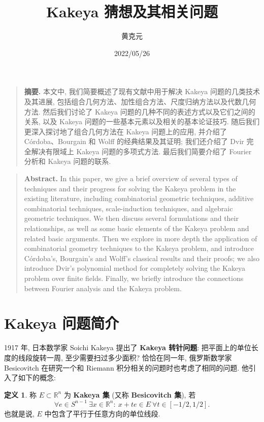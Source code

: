 \documentclass[a4paper, zihao=5]{ctexart}
\numberwithin{equation}{section}
\numberwithin{figure}{section}
\numberwithin{table}{section}
\theoremstyle{definition}
\newtheorem*{definition}{\indent 定义}
\newcommand{\R}{\mathbb{R}}
\begin{document}
\title{Kakeya 猜想及其相关问题}
\author{黄克元}
\date{2022/05/26}
\maketitle%

\begin{quote}
    \textbf{摘要.} 本文中, 我们简要概述了现有文献中用于解决 Kakeya 问题的几类技术及其进展, 包括组合几何方法、加性组合方法、尺度归纳方法以及代数几何方法. 然后我们讨论了 Kakeya 问题的几种不同的表述方式以及它们之间的关系, 以及 Kakeya 问题的一些基本元素以及相关的基本论证技巧. 随后我们更深入探讨地了组合几何方法在 Kakeya 问题上的应用, 并介绍了 C\'ordoba、Bourgain 和 Wolff 的经典结果及其证明; 我们还介绍了 Dvir 完全解决有限域上 Kakeya 问题的多项式方法. 最后我们简要介绍了 Fourier 分析和 Kakeya 问题的联系.
\end{quote}

\begin{quote}
    \textbf{Abstract.} In this paper, we give a brief overview of several types of techniques and their progress for solving the Kakeya problem in the existing literature, including combinatorial geometric techniques, additive combinatorial techniques, scale-induction techniques, and algebraic geometric techniques. We then discuss several formulations and their relationships, as well as some basic elements of the Kakeya problem and related basic arguments. Then we explore in more depth the application of combinatorial geometry techniques to the Kakeya problem, and introduce C\'ordoba's, Bourgain's and Wolff's classical results and their proofs; we also introduce Dvir's polynomial method for completely solving the Kakeya problem over finite fields. Finally, we briefly introduce the connections between Fourier analysis and the Kakeya problem.
\end{quote}

\section{Kakeya 问题简介}

1917 年, 日本数学家 Soichi Kakeya 提出了 \textbf{Kakeya 转针问题}: 把平面上的单位长度的线段旋转一周, 至少需要扫过多少面积? 恰恰在同一年, 俄罗斯数学家 Besicovitch 在研究一个和 Riemann 积分相关的问题时也考虑了相同的问题. 他引入了如下的概念:

\begin{definition}
    称 $E\subset\R^n$ 为 \textbf{Kakeya 集} (又称 \textbf{Besicovitch 集}), 若 
    \begin{equation*}
        \forall e\in S^{n-1}\ \exists x\in\R^n:\ x+te\in E\ \forall t\in [-1/2, 1/2].
    \end{equation*}
    也就是说, $E$ 中包含了平行于任意方向的单位线段.
\end{definition}
\end{document}
